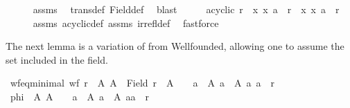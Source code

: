 \begin{isabellebody}
\ \ \ \ \isamarkupfalse%
\ assms\ \isamarkupfalse%
\ trans{\isacharunderscore}{\kern0pt}def\ Field{\isacharunderscore}{\kern0pt}def\ \isamarkupfalse%
\ blast\isanewline
\ \ \isamarkupfalse%
\ \isamarkupfalse%
\ {\isachardoublequoteopen}acyclic\ {\isacharparenleft}{\kern0pt}r\ {\isasyminter}\ {\isacharbraceleft}{\kern0pt}x{\isachardot}{\kern0pt}\ {\isacharparenleft}{\kern0pt}x{\isacharcomma}{\kern0pt}\ a{\isacharparenright}{\kern0pt}\ {\isasymin}\ r{\isacharbraceright}{\kern0pt}\ {\isasymtimes}\ {\isacharbraceleft}{\kern0pt}x{\isachardot}{\kern0pt}\ {\isacharparenleft}{\kern0pt}x{\isacharcomma}{\kern0pt}\ a{\isacharparenright}{\kern0pt}\ {\isasymin}\ r{\isacharbraceright}{\kern0pt}{\isacharparenright}{\kern0pt}{\isachardoublequoteclose}\isanewline
\ \ \ \ \isamarkupfalse%
\ assms\ acyclic{\isacharunderscore}{\kern0pt}def\ assms\ irrefl{\isacharunderscore}{\kern0pt}def\ \isamarkupfalse%
\ fastforce\isanewline
{}\isamarkupfalse%
%
\endisatagproof
{\isafoldproof}%
%
\isadelimproof
%
\endisadelimproof
%
\begin{isamarkuptext}%
The next lemma is a variation of  from Wellfounded,
  allowing one to assume the set included in the field.%
\end{isamarkuptext}\isamarkuptrue%
\isamarkupfalse%
\ wf{\isacharunderscore}{\kern0pt}eq{\isacharunderscore}{\kern0pt}minimal{}{\isacharcolon}{\kern0pt}\ {\isachardoublequoteopen}wf\ r\ {\isasymlongleftrightarrow}\ {\isacharparenleft}{\kern0pt}{\isasymforall}A{\isachardot}{\kern0pt}\ A\ {\isasymsubseteq}\ Field\ r\ {\isasymand}\ A\ {\isasymnoteq}\ {\isacharbraceleft}{\kern0pt}{\isacharbraceright}{\kern0pt}\ {\isasymlongrightarrow}\ {\isacharparenleft}{\kern0pt}{\isasymexists}a\ {\isasymin}\ A{\isachardot}{\kern0pt}\ {\isasymforall}a{\isacharprime}{\kern0pt}\ {\isasymin}\ A{\isachardot}{\kern0pt}\ {\isacharparenleft}{\kern0pt}a{\isacharprime}{\kern0pt}{\isacharcomma}{\kern0pt}\ a{\isacharparenright}{\kern0pt}\ {\isasymnotin}\ r{\isacharparenright}{\kern0pt}{\isacharparenright}{\kern0pt}{\isachardoublequoteclose}\isanewline
%
\isadelimproof
%
\endisadelimproof
%
\isatagproof
{}\isamarkupfalse%
{\isacharminus}{\kern0pt}\isanewline
\ \ \isamarkupfalse%
\ {\isacharquery}{\kern0pt}phi\ {\isacharequal}{\kern0pt}\ {\isachardoublequoteopen}{\isasymlambda}A{\isachardot}{\kern0pt}\ A\ {\isasymnoteq}\ {\isacharbraceleft}{\kern0pt}{\isacharbraceright}{\kern0pt}\ {\isasymlongrightarrow}\ {\isacharparenleft}{\kern0pt}{\isasymexists}a\ {\isasymin}\ A{\isachardot}{\kern0pt}\ {\isasymforall}a{\isacharprime}{\kern0pt}\ {\isasymin}\ A{\isachardot}{\kern0pt}\ {\isacharparenleft}{\kern0pt}a{\isacharprime}{\kern0pt}{\isacharcomma}{\kern0pt}a{\isacharparenright}{\kern0pt}\ {\isasymnotin}\ r{\isacharparenright}{\kern0pt}{\isachardoublequoteclose}\isanewline

\end{isabellebody}
